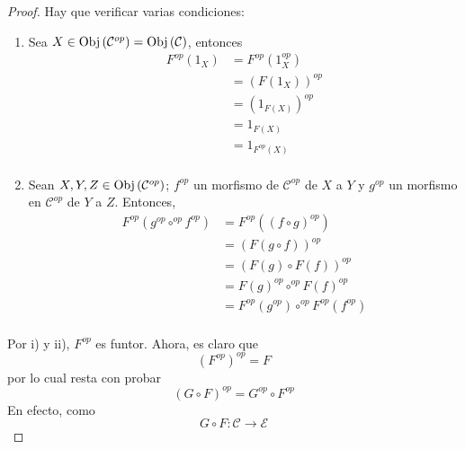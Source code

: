 \documentclass[12pt]{report}
\newcounter{it}
\theoremstyle{largebreak}
\newcommand\cf[3]{\ensuremath{#1:#2\rightarrow#3}}
\newcommand{\Obj}[1]{\ensuremath{\textup{Obj}\left(#1\right)}}
\begin{document}
    \begin{proof}
        Hay que verificar varias condiciones:
        \renewcommand{\theenumi}{\roman{enumi}}
        \begin{enumerate}
            \item Sea $X\in\Obj{\mathcal{C}^{op}}=\Obj{\mathcal{C}}$, entonces
            \begin{equation*}
                \begin{split}
                    F^{op}(1_X)&=F^{op}(1_X^{op})\\
                    &=(F(1_X))^{op}\\
                    &=(1_{F(X)})^{op}\\
                    &=1_{F(X)}\\
                    &=1_{F^{op}(X)}\\
                \end{split}
            \end{equation*}
            \item Sean $X,Y,Z\in\Obj{\mathcal{C}^{op}}$; $f^{op}$ un morfismo de $\mathcal{C}^{op}$ de $X$ a $Y$ y $g^{op}$ un morfismo en $\mathcal{C}^{op}$ de $Y$ a $Z$. Entonces,
            \begin{equation*}
                \begin{split}
                    F^{op}(g^{op}\circ^{op}f^{op})&=F^{op}((f\circ g)^{op})\\
                    &=(F(g\circ f))^{op}\\
                    &=(F(g)\circ F(f))^{op}\\
                    &=F(g)^{op}\circ^{op}F(f)^{op}\\
                    &=F^{op}(g^{op})\circ^{op}F^{op}(f^{op})\\
                \end{split}
            \end{equation*}
        \end{enumerate}
        Por i) y ii), $F^{op}$ es funtor. Ahora, es claro que
        \begin{equation*}
            (F^{op})^{op}=F
        \end{equation*}
        por lo cual resta con probar
        \begin{equation*}
            (G\circ F)^{op}=G^{op}\circ F^{op}
        \end{equation*}
        En efecto, como
        \begin{equation*}
            \cf{G\circ F}{\mathcal{C}}{\mathcal{E}}

\end{equation*}
\end{proof}
\end{document}
